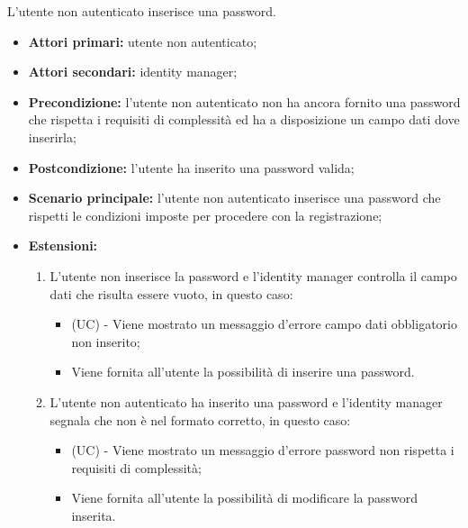 L'utente non autenticato inserisce una password.
\begin{itemize}
	\item \textbf{Attori primari:} utente non autenticato;
	\item \textbf{Attori secondari:} identity manager;
	\item \textbf{Precondizione:} l'utente non autenticato non ha ancora fornito una password che rispetta i requisiti di complessità ed ha a disposizione un campo dati dove inserirla;
	\item \textbf{Postcondizione:} l'utente ha inserito una password valida;
	\item \textbf{Scenario principale:} l'utente non autenticato inserisce una password che rispetti le condizioni imposte per procedere con la registrazione;
	\item \textbf{Estensioni:} 
	\begin{enumerate}
		\item L'utente non inserisce la password e l'identity manager controlla il campo dati che risulta essere vuoto, in questo caso:
		\begin{itemize}
			\item (UC) - Viene mostrato un messaggio d'errore campo dati obbligatorio non inserito;
			\item Viene fornita all'utente la possibilità di inserire una password.
		\end{itemize}
		\item L'utente non autenticato ha inserito una password e l'identity manager segnala che non è nel formato corretto, in questo caso:
		\begin{itemize}
			\item (UC) - Viene mostrato un messaggio d'errore password non rispetta i requisiti di complessità;
			\item Viene fornita all'utente la possibilità di modificare la password inserita.
		\end{itemize}
	\end{enumerate} 
\end{itemize}

